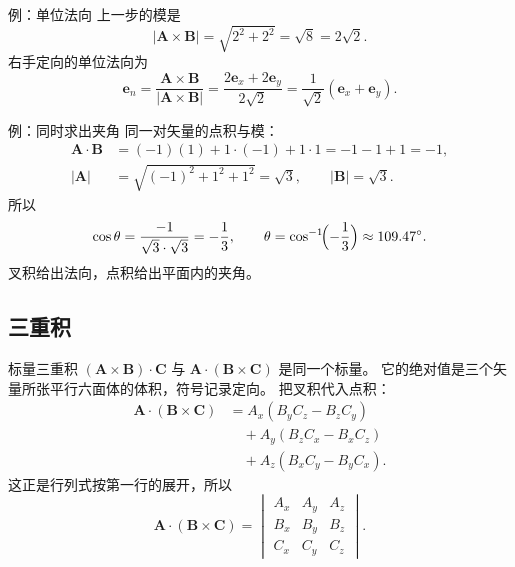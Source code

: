 \documentclass[fontset=windows, chinese, 10pt, xcolor=dvipsnames]{beamer}
\begin{document}
\begin{frame}{例：单位法向}
  上一步的模是
  \begin{equation*}
    |\mathbf{A}\times\mathbf{B}|
    = \sqrt{2^2+2^2}
    = \sqrt{8}
    = 2\sqrt{2}.
  \end{equation*}
  右手定向的单位法向为
  \begin{equation*}
    \mathbf{e}_n
    = \frac{\mathbf{A}\times\mathbf{B}}{|\mathbf{A}\times\mathbf{B}|}
    = \frac{2\mathbf{e}_x+2\mathbf{e}_y}{2\sqrt{2}}
    = \frac{1}{\sqrt{2}}(\mathbf{e}_x+\mathbf{e}_y).
  \end{equation*}
\end{frame}

\begin{frame}{例：同时求出夹角}
  同一对矢量的点积与模：
  \begin{align*}
    \mathbf{A}\cdot\mathbf{B}
    &= (-1)(1)+1\cdot(-1)+1\cdot 1
     = -1-1+1
     = -1,\\
    |\mathbf{A}|
    &= \sqrt{(-1)^2+1^2+1^2}
     = \sqrt{3},
    \qquad
    |\mathbf{B}|=\sqrt{3}.
  \end{align*}
  所以
  \begin{equation*}
    \cos\theta
    = \frac{-1}{\sqrt{3}\cdot\sqrt{3}}
    = -\frac13,
    \qquad
    \theta
    = \cos^{-1}\!\Bigl(-\frac13\Bigr)
    \approx 109.47^\circ.
  \end{equation*}
  叉积给出法向，点积给出平面内的夹角。
\end{frame}

\subsection{三重积}

\begin{frame}{标量三重积}
  $(\mathbf{A}\times\mathbf{B})\cdot\mathbf{C}$
  与
  $\mathbf{A}\cdot(\mathbf{B}\times\mathbf{C})$
  是同一个标量。
  它的绝对值是三个矢量所张平行六面体的体积，符号记录定向。
  \vspace{0.4em}
  把叉积代入点积：
  \begin{align*}
    \mathbf{A}\cdot(\mathbf{B}\times\mathbf{C})
    &= A_x(B_y C_z-B_z C_y) \\
    &\quad + A_y(B_z C_x-B_x C_z) \\
    &\quad + A_z(B_x C_y-B_y C_x).
  \end{align*}
  这正是行列式按第一行的展开，所以
  \begin{equation*}
    \mathbf{A}\cdot(\mathbf{B}\times\mathbf{C})
    =
    \begin{vmatrix}
      A_x & A_y & A_z \\
      B_x & B_y & B_z \\
      C_x & C_y & C_z
    \end{vmatrix}.
  \end{equation*}
\end{frame}
\end{document}
